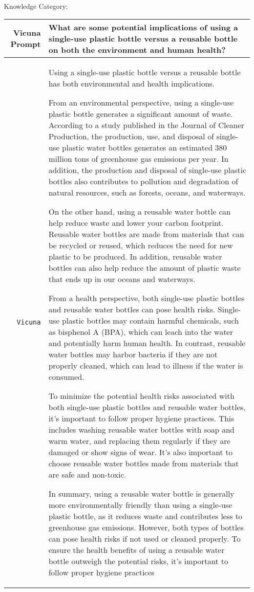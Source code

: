 \documentclass{article}
\begin{document}
{Knowledge Category:

{  \footnotesize \begin{tabularx}{\linewidth}{r X} \toprule Vicuna Prompt  & {\bf What are some potential implications of using a single-use plastic bottle versus a reusable bottle on both the environment and human health?}
\\
\midrule \texttt{Vicuna}  &
Using a single-use plastic bottle versus a reusable bottle has both environmental and health implications.

From an environmental perspective, using a single-use plastic bottle generates a significant amount of waste. According to a study published in the Journal of Cleaner Production, the production, use, and disposal of single-use plastic water bottles generates an estimated 380 million tons of greenhouse gas emissions per year. In addition, the production and disposal of single-use plastic bottles also contributes to pollution and degradation of natural resources, such as forests, oceans, and waterways.

On the other hand, using a reusable water bottle can help reduce waste and lower your carbon footprint. Reusable water bottles are made from materials that can be recycled or reused, which reduces the need for new plastic to be produced. In addition, reusable water bottles can also help reduce the amount of plastic waste that ends up in our oceans and waterways.

From a health perspective, both single-use plastic bottles and reusable water bottles can pose health risks. Single-use plastic bottles may contain harmful chemicals, such as bisphenol A (BPA), which can leach into the water and potentially harm human health. In contrast, reusable water bottles may harbor bacteria if they are not properly cleaned, which can lead to illness if the water is consumed.

To minimize the potential health risks associated with both single-use plastic bottles and reusable water bottles, it's important to follow proper hygiene practices. This includes washing reusable water bottles with soap and warm water, and replacing them regularly if they are damaged or show signs of wear. It's also important to choose reusable water bottles made from materials that are safe and non-toxic.

In summary, using a reusable water bottle is generally more environmentally friendly than using a single-use plastic bottle, as it reduces waste and contributes less to greenhouse gas emissions. However, both types of bottles can pose health risks if not used or cleaned properly. To ensure the health benefits of using a reusable water bottle outweigh the potential risks, it's important to follow proper hygiene practices 


\end{tabularx}}}
\end{document}

